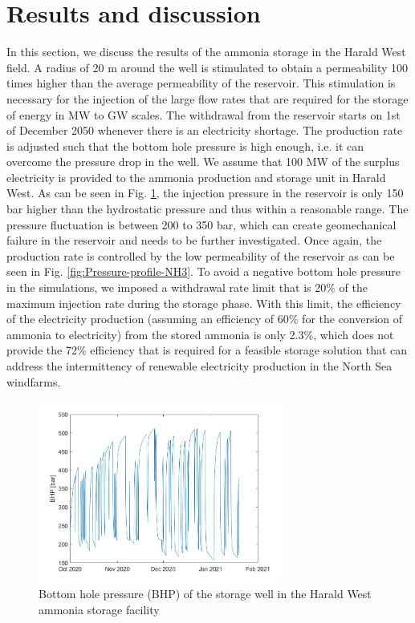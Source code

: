 \documentclass{ECOS_2021}
\begin{document}
\sffamily \section{Results and discussion}
\normalsize
In this section, we discuss the results of the ammonia storage in the Harald West field. A radius of 20
m around the well is stimulated to obtain a permeability 100 times
higher than the average permeability of the reservoir. This stimulation
is necessary for the injection of the large flow rates that are required
for the storage of energy in MW to GW scales. The withdrawal from
the reservoir starts on 1st of December 2050 whenever there is an
electricity shortage. The production rate is adjusted such that the
bottom hole pressure is high enough, i.e. it can overcome the pressure
drop in the well. We assume
that 100 MW of the surplus electricity is provided to the ammonia
production and storage unit in Harald West.
As can be seen in Fig. \ref{fig:Bottom-hole-pressure-NH3}, the injection
pressure in the reservoir is only 150 bar higher than the hydrostatic
pressure and thus within a reasonable range. The pressure fluctuation
is between 200 to 350 bar, which can create geomechanical failure
in the reservoir and needs to be further investigated. Once again,
the production rate is controlled by the low permeability of the reservoir
as can be seen in Fig. \ref{fig:Pressure-profile-NH3}. To avoid a
negative bottom hole pressure in the simulations, we imposed a withdrawal
rate limit that is 20\% of the maximum injection rate during the storage
phase. With this limit, the efficiency of the electricity production
(assuming an efficiency of 60\% for the conversion of ammonia to electricity)
from the stored ammonia is only 2.3\%, which does not provide the 72\% efficiency
that is required for a feasible storage solution that can address
the intermittency of renewable electricity production in the North
Sea windfarms.

\begin{figure}[H]
\centering
\includegraphics[width=8cm]{ammonia_p_hist}

\caption{\label{fig:Bottom-hole-pressure-NH3}Bottom hole pressure (BHP) of
the storage well in the Harald West ammonia storage facility}
\end{figure}
\end{document}
